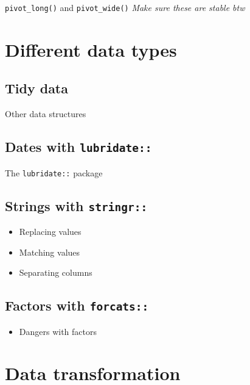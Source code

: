 \documentclass[]{book}
\providecommand{\tightlist}{%
  \setlength{\itemsep}{0pt}\setlength{\parskip}{0pt}}
\begin{document}
\texttt{pivot\_long()} and \texttt{pivot\_wide()}
\emph{Make sure these are stable btw}

\hypertarget{different-data-types}{%
\chapter{Different data types}\label{different-data-types}}

\hypertarget{tidy-data}{%
\section{Tidy data}\label{tidy-data}}

Other data structures

\hypertarget{dates-with-lubridate}{%
\section{\texorpdfstring{Dates with \texttt{lubridate::}}{Dates with lubridate::}}\label{dates-with-lubridate}}

The \texttt{lubridate::} package

\hypertarget{strings-with-stringr}{%
\section{\texorpdfstring{Strings with \texttt{stringr::}}{Strings with stringr::}}\label{strings-with-stringr}}

\begin{itemize}
\tightlist
\item
  Replacing values
\item
  Matching values
\item
  Separating columns
\end{itemize}

\hypertarget{factors-with-forcats}{%
\section{\texorpdfstring{Factors with \texttt{forcats::}}{Factors with forcats::}}\label{factors-with-forcats}}

\begin{itemize}
\tightlist
\item
  Dangers with factors
\end{itemize}

\hypertarget{data-transformation}{%
\chapter{Data transformation}\label{data-transformation}}
\end{document}
